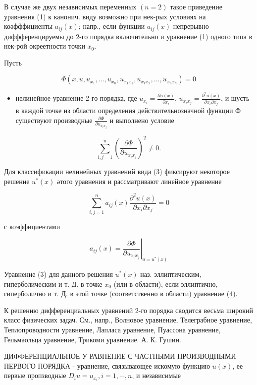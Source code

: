 \documentclass[10pt]{article}
\begin{document}
В случае же двух независимых переменных $(n=2)$ такое приведение уравнения (1) к канонич. виду возможно при нек-рых условиях на коәфффициенты $a_{i j}(x)$; напр., если функции $a_{i j}(x)$ непрерывно диффференцируемы до 2-го порядка включительно и уравнение (1) одного типа в нек-рой окреетности точки $x_{0}$.



Пусть



\[

\Phi\left(x, u, u_{x_{1}}, \ldots, u_{x_{n}}, u_{x_{1} x_{1}}, u_{x_{1} x_{2}}, \ldots, u_{x_{n} x_{n}}\right)=0

\]



\begin{itemize}

  \item нелинейное уравнение 2-го порядка, где $u_{x_{i}}=\frac{\partial u(x)}{\partial x_{i}}$, $u_{x_{i} x_{j}}=\frac{\partial^{2} u(x)}{\partial x_{i} \partial x_{j}}$, и шусть в каждой точке из области определения действительнозначной функции Ф существуют производные $\frac{\partial \Phi}{\partial u_{x_{i} x_{j}}}$ и выполнено условие

\end{itemize}



\[

\sum_{i, j=1}^{n}\left(\frac{\partial \Phi}{\partial u_{x_{i} x_{j}}}\right)^{2} \neq 0 .

\]



Для классификации нелинейных уравнений вида (3) фиксируют некоторое решение $u^{*}(x)$ әтого уравнения и рассматривают линейное уравнение



\[

\sum_{i, j=1}^{n} a_{i j}(x) \frac{\partial^{2} u(x)}{\partial x_{i} \partial x_{j}}=0

\]



с коэффициентами



\[

a_{i j}(x)=\left.\frac{\partial \Phi}{\partial u_{x_{i} x_{j}}}\right|_{u=u^{*}(x)}

\]



Уравнение (3) для данного решения $u^{*}(x)$ наз. эллиптическим, гиперболическим и т. Д. в точке $x_{0}$ (или в области), если эллиптично, гиперболично и т. Д. в этой точке (соответственно в области) уравнение (4).



К решению дифференциальных уравнений 2-го порядка сводится весьма широкий класс физических задач. См., напр., Волновое уравнение, Телеграбное уравнение, Теплопроводности уравнение, Лапласа уравнение, Пуассона уравнение, Гельмәольца уравнение, Трикоми уравнение. А. К. Гушин.



ДИФФЕРЕНЦИАЛЬНОЕ У РАВНЕНИЕ С ЧАСТНЫМИ ПРОИЗВОДНЫМИ ПЕРВОГО ПОРЯДКА - уравнение, связывающее искомую функцию $u(x)$, ее первые пропзводные $D_{i} u=u_{x_{i}}, i=1, \cdots, n$, и независимые
\end{document}
